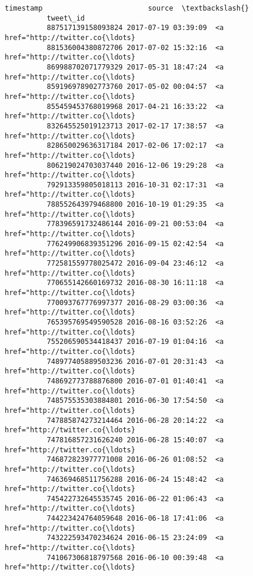 \documentclass[11pt]{article}
\begin{document}
\begin{Verbatim}[commandchars=\\\{\}]
                                       timestamp                         source  \textbackslash{}
          tweet\_id                                                                
          887517139158093824 2017-07-19 03:39:09  <a href="http://twitter.co{\ldots}   
          881536004380872706 2017-07-02 15:32:16  <a href="http://twitter.co{\ldots}   
          869988702071779329 2017-05-31 18:47:24  <a href="http://twitter.co{\ldots}   
          859196978902773760 2017-05-02 00:04:57  <a href="http://twitter.co{\ldots}   
          855459453768019968 2017-04-21 16:33:22  <a href="http://twitter.co{\ldots}   
          832645525019123713 2017-02-17 17:38:57  <a href="http://twitter.co{\ldots}   
          828650029636317184 2017-02-06 17:02:17  <a href="http://twitter.co{\ldots}   
          806219024703037440 2016-12-06 19:29:28  <a href="http://twitter.co{\ldots}   
          792913359805018113 2016-10-31 02:17:31  <a href="http://twitter.co{\ldots}   
          788552643979468800 2016-10-19 01:29:35  <a href="http://twitter.co{\ldots}   
          778396591732486144 2016-09-21 00:53:04  <a href="http://twitter.co{\ldots}   
          776249906839351296 2016-09-15 02:42:54  <a href="http://twitter.co{\ldots}   
          772581559778025472 2016-09-04 23:46:12  <a href="http://twitter.co{\ldots}   
          770655142660169732 2016-08-30 16:11:18  <a href="http://twitter.co{\ldots}   
          770093767776997377 2016-08-29 03:00:36  <a href="http://twitter.co{\ldots}   
          765395769549590528 2016-08-16 03:52:26  <a href="http://twitter.co{\ldots}   
          755206590534418437 2016-07-19 01:04:16  <a href="http://twitter.co{\ldots}   
          748977405889503236 2016-07-01 20:31:43  <a href="http://twitter.co{\ldots}   
          748692773788876800 2016-07-01 01:40:41  <a href="http://twitter.co{\ldots}   
          748575535303884801 2016-06-30 17:54:50  <a href="http://twitter.co{\ldots}   
          747885874273214464 2016-06-28 20:14:22  <a href="http://twitter.co{\ldots}   
          747816857231626240 2016-06-28 15:40:07  <a href="http://twitter.co{\ldots}   
          746872823977771008 2016-06-26 01:08:52  <a href="http://twitter.co{\ldots}   
          746369468511756288 2016-06-24 15:48:42  <a href="http://twitter.co{\ldots}   
          745422732645535745 2016-06-22 01:06:43  <a href="http://twitter.co{\ldots}   
          744223424764059648 2016-06-18 17:41:06  <a href="http://twitter.co{\ldots}   
          743222593470234624 2016-06-15 23:24:09  <a href="http://twitter.co{\ldots}   
          741067306818797568 2016-06-10 00:39:48  <a href="http://twitter.co{\ldots}   

\end{Verbatim}
\end{document}
